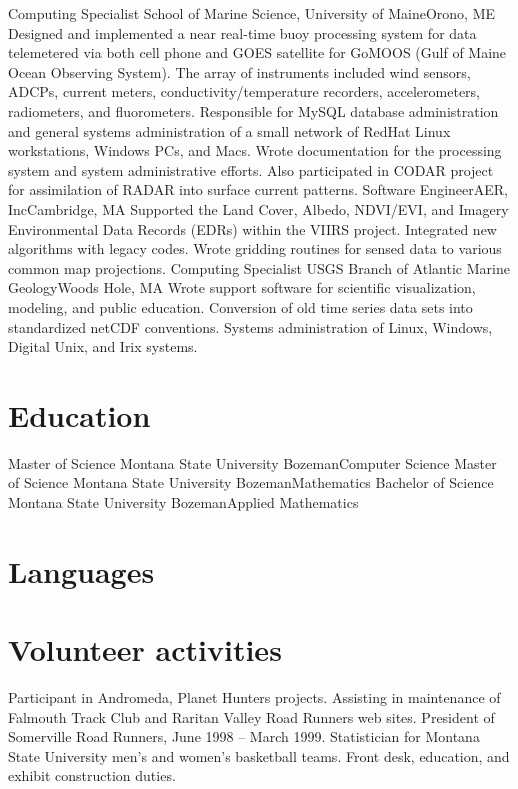 \documentclass[11pt]{moderncv}  %
\begin{document}
    {Computing Specialist}
    {School of Marine Science, University of Maine}{Orono, ME}{}
        {Designed and implemented a near real-time buoy processing system
        for data telemetered via both cell phone and GOES satellite
        for GoMOOS (Gulf of Maine Ocean Observing System).   The array
        of instruments included wind sensors, ADCPs, current meters,
        conductivity/temperature recorders, accelerometers, radiometers,
        and fluorometers.   Responsible for MySQL database administration
        and general systems administration of a small network of RedHat
        Linux workstations, Windows PCs, and Macs.   Wrote documentation
        for the processing system and system administrative efforts.
        Also participated in CODAR project for assimilation of RADAR
        into surface current patterns.}
    {Software Engineer}{AER, Inc}{Cambridge, MA}{}
      {Supported the Land Cover, Albedo, NDVI/EVI, and
      Imagery Environmental Data Records (EDRs) within the VIIRS
      project. Integrated new algorithms with legacy codes. Wrote gridding
      routines for sensed data to various common map projections.}
    {Computing Specialist}
    {USGS Branch of Atlantic Marine Geology}{Woods Hole, MA}{}
      {Wrote support software for scientific visualization, modeling,
      and public education. Conversion of old time series data sets into
      standardized netCDF conventions.  Systems administration of Linux,
      Windows, Digital Unix, and Irix systems.}

\section{Education}
    {Master of Science}
    {Montana State University}
    {Bozeman}{}{Computer Science}
    {Master of Science}
    {Montana State University}
    {Bozeman}{}{Mathematics}
    {Bachelor of Science}
    {Montana State University}
    {Bozeman}{}{Applied Mathematics}

\section{Languages}

\section{Volunteer activities}
  {Participant in Andromeda, Planet Hunters projects.}
  {Assisting in maintenance of Falmouth Track Club and Raritan Valley
   Road Runners web sites.
   President of Somerville Road Runners, June 1998 -- March 1999.}
  {Statistician for Montana State University men's and women's basketball
  teams.}
  {Front desk, education, and exhibit construction duties.}
\end{document}

